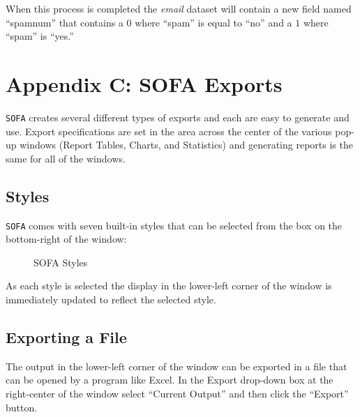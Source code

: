 When this process is completed the \textit{email} dataset will contain a new field named ``spamnum'' that contains a $ 0 $ where ``spam'' is equal to ``no'' and a $ 1 $ where ``spam'' is ``yes.''

\section{Appendix C: SOFA Exports} \label{app:c}

\texttt{SOFA} creates several different types of exports and each are easy to generate and use. Export specifications are set in the area across the center of the various pop-up windows (Report Tables, Charts, and Statistics) and generating reports is the same for all of the windows.

\subsection{Styles}

\texttt{SOFA} comes with seven built-in styles that can be selected from the box on the bottom-right of the window:

\begin{figure}[H]
  \begin{center}
    \caption{SOFA Styles}
  \end{center}
\end{figure}

As each style is selected the display in the lower-left corner of the window is immediately updated to reflect the selected style.

\subsection{Exporting a File}

The output in the lower-left corner of the window can be exported in a file that can be opened by a program like Excel. In the Export drop-down box at the right-center of the window select ``Current Output'' and then click the ``Export'' button.

